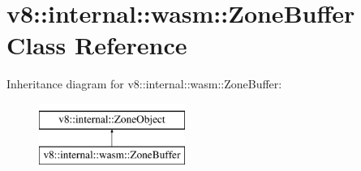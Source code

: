 \hypertarget{classv8_1_1internal_1_1wasm_1_1ZoneBuffer}{}\section{v8\+:\+:internal\+:\+:wasm\+:\+:Zone\+Buffer Class Reference}
\label{classv8_1_1internal_1_1wasm_1_1ZoneBuffer}
Inheritance diagram for v8\+:\+:internal\+:\+:wasm\+:\+:Zone\+Buffer\+:\begin{figure}[H]
\begin{center}
\leavevmode
\includegraphics[height=2.000000cm]{classv8_1_1internal_1_1wasm_1_1ZoneBuffer}
\end{center}
\end{figure}
